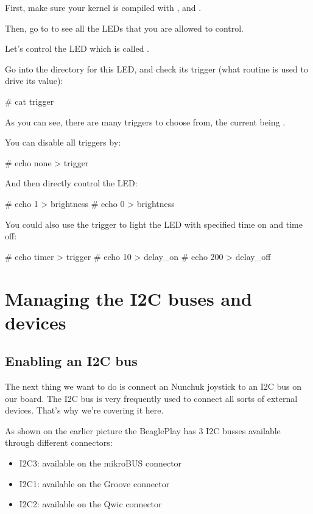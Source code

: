 First, make sure your kernel is compiled with
, 
and .

Then, go to  to see all the LEDs that you are allowed
to control.

Let's control the LED which is called
.

Go into the directory for this LED, and check its trigger (what
routine is used to drive its value):

\begin{bashinput}
# cat trigger
\end{bashinput}

As you can see, there are many triggers to choose from, the current
being .

You can disable all triggers by:

\begin{bashinput}
# echo none > trigger
\end{bashinput}

And then directly control the LED:

\begin{bashinput}
# echo 1 > brightness
# echo 0 > brightness
\end{bashinput}

You could also use the  trigger to light the LED
with specified time on and time off:

\begin{bashinput}
# echo timer > trigger
# echo 10 > delay_on
# echo 200 > delay_off
\end{bashinput}

\section{Managing the I2C buses and devices}

\subsection{Enabling an I2C bus}

The next thing we want to do is connect an Nunchuk joystick
to an I2C bus on our board. The I2C bus is very frequently used
to connect all sorts of external devices. That's why we're covering
it here.

As shown on the earlier picture the BeaglePlay has 3 I2C
busses available through different connectors:
\begin{itemize}
\item I2C3: available on the mikroBUS connector
\item I2C1: available on the Groove connector
\item I2C2: available on the Qwic connector
\end{itemize}

